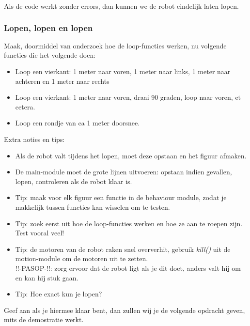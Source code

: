\documentclass[a4paper]{article}
\begin{document}
Als de code werkt zonder errors, dan kunnen we de robot eindelijk laten lopen.

\subsubsection{Lopen, lopen en lopen}
Maak, doormiddel van onderzoek hoe de loop-functies werken, nu volgende functies die het volgende doen:
\begin{itemize}
\item Loop een vierkant: 1 meter naar voren, 1 meter naar links, 1 meter naar achteren en 1 meter naar rechts
\item Loop een vierkant: 1 meter naar voren, draai 90 graden, loop naar voren, et cetera.
\item Loop een rondje van ca 1 meter doorsnee.
\end{itemize}

Extra noties en tips:
\begin{itemize}
\item Als de robot valt tijdens het lopen, moet deze opstaan en het figuur afmaken.
\item De main-module moet de grote lijnen uitvoeren: opstaan indien gevallen, lopen, controleren als de robot klaar is.
\item Tip: maak voor elk figuur een functie in de behaviour module, zodat je makkelijk tussen functies kan wisselen om te testen.
\item Tip: zoek eerst uit hoe de loop-functies werken en hoe ze aan te roepen zijn. Test vooral veel!
\item Tip: de motoren van de robot raken snel oververhit, gebruik \textit{kill()} uit de motion-module om de motoren uit te zetten. \\ !!-PASOP-!!: zorg ervoor dat de robot ligt als je dit doet, anders valt hij om en kan hij stuk gaan.
\item Tip: Hoe exact kun je lopen?
\end{itemize}

Geef aan als je hiermee klaar bent, dan zullen wij je de volgende opdracht geven, mits de demostratie werkt.
\end{document}
